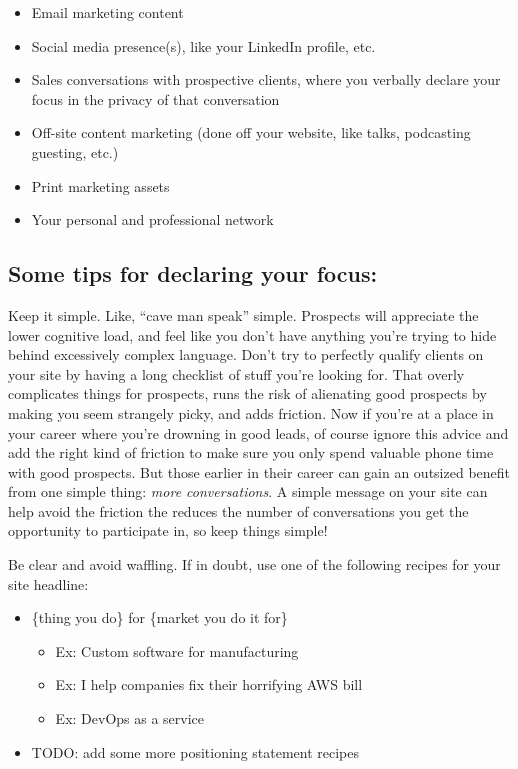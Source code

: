 \begin{itemize}
\item Email marketing content
\item Social media presence(s), like your LinkedIn profile, etc.
\item Sales conversations with prospective clients, where you verbally declare your focus in the privacy of that conversation
\item Off-site content marketing (done off your website, like talks, podcasting guesting, etc.)
\item Print marketing assets
\item Your personal and professional network
\end{itemize}

\subsection{Some tips for declaring your focus:}

Keep it simple. Like, ``cave man speak'' simple. Prospects will appreciate the lower cognitive load, and feel like you don't have anything you're trying to hide behind excessively complex language. Don't try to perfectly qualify clients on your site by having a long checklist of stuff you're looking for. That overly complicates things for prospects, runs the risk of alienating good prospects by making you seem strangely picky, and adds friction. Now if you're at a place in your career where you're drowning in good leads, of course ignore this advice and add the right kind of friction to make sure you only spend valuable phone time with good prospects. But those earlier in their career can gain an outsized benefit from one simple thing: \emph{more conversations}. A simple message on your site can help avoid the friction the reduces the number of conversations you get the opportunity to participate in, so keep things simple!

Be clear and avoid waffling. If in doubt, use one of the following recipes for your site headline:

\begin{itemize}
\item \{thing you do\} for \{market you do it for\}


\begin{itemize}
\item Ex: Custom software for manufacturing
\item Ex: I help companies fix their horrifying AWS bill
\item Ex: DevOps as a service
\end{itemize}
\item TODO: add some more positioning statement recipes
\end{itemize}

